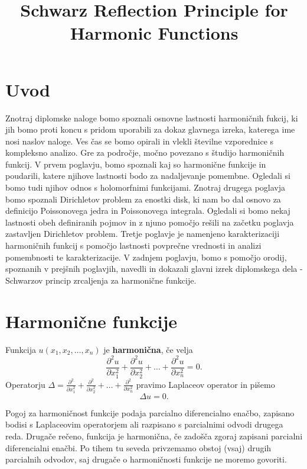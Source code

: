 \documentclass[mat1]{fmfdelo}
\title{Schwarz Reflection Principle for Harmonic Functions}
\begin{document}
\section{Uvod}
Znotraj diplomske naloge bomo spoznali osnovne lastnosti harmoničnih fukcij, ki jih bomo proti koncu s pridom uporabili za dokaz glavnega izreka, katerega ime nosi naslov naloge.
Ves čas se bomo opirali in vlekli številne vzporednice s kompleksno analizo. Gre za področje, močno povezano s študijo harmoničnih funkcij.
\newline
V prvem poglavju, bomo spoznali kaj so harmonične funkcije in poudarili, katere njihove lastnosti bodo za nadaljevanje pomembne. Ogledali si bomo tudi njihov odnos s holomorfnimi funkcijami. 
Znotraj drugega poglavja bomo spoznali Dirichletov problem za enostki disk, ki nam bo dal osnovo za definicijo Poissonovega jedra in Poissonovega integrala. Ogledali si bomo nekaj lastnosti obeh definiranih pojmov in z njuno pomočjo rešili na začetku poglavja zastavljen Dirichletov problem.
Tretje poglavje je namenjeno karakterizaciji harmoničnih funkcij s pomočjo lastnosti povprečne vrednosti in analizi pomembnosti te karakterizacije. 
V zadnjem poglavju, bomo s pomočjo orodij, spoznanih v prejšnih poglavjih, navedli in dokazali glavni izrek diplomskega dela - Schwarzov princip zrcaljenja za harmonične funkcije.
%

\section{Harmonične funkcije}
    \begin{definicija}
        Funkcija $u(x_1, x_2, \dots, x_n)$ je \textbf{harmonična}, če velja
        $$
        \frac{\partial^2 u}{\partial x_1 ^ 2} +  \frac{\partial^2 u}{\partial x_2 ^ 2} + \dots + \frac{\partial^2 u}{\partial x_n ^ 2} = 0.
        $$
        Operatorju $\Delta  = \frac{\partial^2}{\partial x_1 ^ 2} +  \frac{\partial^2}{\partial x_2 ^ 2} + \dots + \frac{\partial^2}{\partial x_n ^ 2}$ pravimo Laplaceov operator in pišemo
        $$
        \Delta u = 0.
        $$
    \end{definicija}

    Pogoj za harmoničnost funkcije podaja parcialno diferencialno enačbo, zapisano bodisi s Laplaceovim operatorjem ali razpisano s parcialnimi odvodi drugega reda. Drugače rečeno, funkcija je harmonična, če zadošča zgoraj zapisani parcialni diferencialni enačbi. 
    Po tihem tu seveda privzemamo obstoj (vsaj) drugih parcialnih odvodov, saj drugače o harmoničnosti funkcije ne moremo govoriti.
\end{document}
